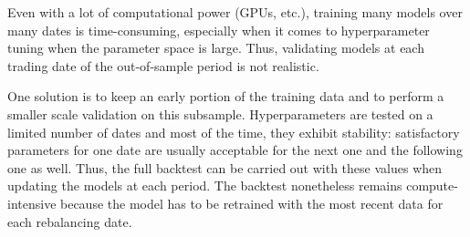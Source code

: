Even with a lot of computational power (GPUs, etc.), training many models over many dates is time-consuming, especially when it comes to hyperparameter tuning when the parameter space is large. Thus, validating models at each trading date of the out-of-sample period is not realistic.

One solution is to keep an early portion of the training data and to perform a smaller scale validation on this subsample. Hyperparameters are tested on a limited number of dates and most of the time, they exhibit stability: satisfactory parameters for one date are usually acceptable for the next one and the following one as well. Thus, the full backtest can be carried out with these values when updating the models at each period. The backtest nonetheless remains compute-intensive because the model has to be retrained with the most recent data for each rebalancing date.